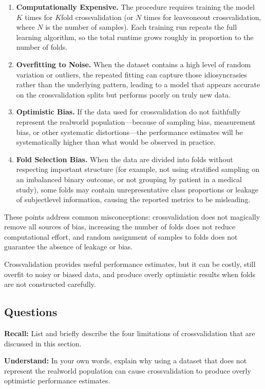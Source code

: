 \documentclass[12pt, a4paper]{article}
\begin{document}
\begin{enumerate}
  \item \textbf{Computationally Expensive.} The procedure requires training the model $K$ times for $K$fold crossvalidation (or $N$ times for leaveoneout crossvalidation, where $N$ is the number of samples). Each training run repeats the full learning algorithm, so the total runtime grows roughly in proportion to the number of folds.
  \item \textbf{Overfitting to Noise.} When the dataset contains a high level of random variation or outliers, the repeated fitting can capture those idiosyncrasies rather than the underlying pattern, leading to a model that appears accurate on the crossvalidation splits but performs poorly on truly new data.
  \item \textbf{Optimistic Bias.} If the data used for crossvalidation do not faithfully represent the realworld population---because of sampling bias, measurement bias, or other systematic distortions---the performance estimates will be systematically higher than what would be observed in practice.
  \item \textbf{Fold Selection Bias.} When the data are divided into folds without respecting important structure (for example, not using stratified sampling on an imbalanced binary outcome, or not grouping by patient in a medical study), some folds may contain unrepresentative class proportions or leakage of subjectlevel information, causing the reported metrics to be misleading.
\end{enumerate}

These points address common misconceptions: crossvalidation does not magically remove all sources of bias, increasing the number of folds does not reduce computational effort, and random assignment of samples to folds does not guarantee the absence of leakage or bias.

Crossvalidation provides useful performance estimates, but it can be costly, still overfit to noisy or biased data, and produce overly optimistic results when folds are not constructed carefully.

\subsection*{Questions}
\textbf{Recall:}  
List and briefly describe the four limitations of crossvalidation that are discussed in this section.

\newpage
\textbf{Understand:}  
In your own words, explain why using a dataset that does not represent the realworld population can cause crossvalidation to produce overly optimistic performance estimates.
\end{document}
